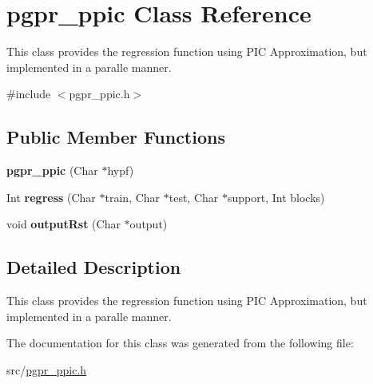 \hypertarget{classpgpr__ppic}{\section{pgpr\+\_\+ppic Class Reference}
\label{classpgpr__ppic}
}


This class provides the regression function using P\+I\+C Approximation, but implemented in a paralle manner.  




{\ttfamily \#include $<$pgpr\+\_\+ppic.\+h$>$}

\subsection*{Public Member Functions}
\begin{DoxyCompactItemize}
\item 
\hypertarget{classpgpr__ppic_a265983e631160128b356f3a04532622d}{{\bfseries pgpr\+\_\+ppic} (Char $\ast$hypf)}\label{classpgpr__ppic_a265983e631160128b356f3a04532622d}

\item 
\hypertarget{classpgpr__ppic_adbb199505cefb82f2765e259100f52e1}{Int {\bfseries regress} (Char $\ast$train, Char $\ast$test, Char $\ast$support, Int blocks)}\label{classpgpr__ppic_adbb199505cefb82f2765e259100f52e1}

\item 
\hypertarget{classpgpr__ppic_a765337e712a4eeb5c2de3e9c0ea7241b}{void {\bfseries output\+Rst} (Char $\ast$output)}\label{classpgpr__ppic_a765337e712a4eeb5c2de3e9c0ea7241b}

\end{DoxyCompactItemize}


\subsection{Detailed Description}
This class provides the regression function using P\+I\+C Approximation, but implemented in a paralle manner. 

The documentation for this class was generated from the following file\+:\begin{DoxyCompactItemize}
\item 
src/\hyperlink{pgpr__ppic_8h}{pgpr\+\_\+ppic.\+h}\end{DoxyCompactItemize}
